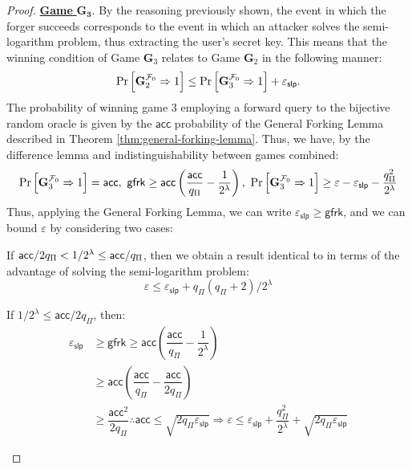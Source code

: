 \documentclass[version=submission, floatrow]{iacrcc}
\begin{document}
\begin{proof}
\noindent\underline{\textbf{Game} $\mathbf{G_{3}}$}. By the reasoning previously shown, the event in which the forger succeeds corresponds to the event in which an attacker solves the semi-logarithm problem, thus extracting the user's secret key. This means that the winning condition of Game $\mathbf{G}_{3}$ relates to Game $\mathbf{G}_{2}$ in the following manner:\[
    \mathrm{Pr}\left[\mathbf{G}_{2}^{\mathcal{F}_{0}} \Rightarrow 1\right] \le \mathrm{Pr}\left[\mathbf{G}_{3}^{\mathcal{F}_{0}} \Rightarrow 1\right]  + \varepsilon_{\mathsf{slp}}.
\]
The probability of winning game $3$ employing a forward query to the bijective random oracle is given by the $\mathsf{acc}$ probability of the General Forking Lemma described in Theorem \ref{thm:general-forking-lemma}. Thus, we have, by the difference lemma and indistinguishability between games combined:
\begin{equation*}
    \Probability{\mathbf{G}_{3}^{\Forger_{0}} \Rightarrow 1} = \mathsf{acc},\ \mathsf{gfrk} \ge \mathsf{acc}\left(\dfrac{\mathsf{acc}}{q_{\Pi}} - \dfrac{1}{2^{\lambda}}\right),\ \Probability{\mathbf{G}_{3}^{\Forger_{0}} \Rightarrow 1} \ge \varepsilon - \varepsilon_{\mathsf{slp}} - \dfrac{q_{\Pi}^{2}}{2^{\lambda}} 
\end{equation*}
Thus, applying the General Forking Lemma, we can write $\varepsilon_{\mathsf{slp}} \ge \mathsf{gfrk}$, and we can bound $\varepsilon$ by considering two cases:
\begin{case}
If $\mathsf{acc}/2q_{\Pi} < 1/2^{\lambda} \le \mathsf{acc}/q_{\Pi}$, then we obtain a result identical to \cite{CCS:FerKilPoe16} in terms of the advantage of solving the semi-logarithm problem:\[
    \varepsilon \le \varepsilon_{\mathsf{slp}} + q_{\Pi}\left(q_{\Pi}+2\right)/2^{\lambda}
\]
\end{case}
\begin{case}
If $1/2^{\lambda} \le \mathsf{acc}/2q_{\Pi}$, then:
\begin{align*}
    \varepsilon_{\mathsf{slp}} &\ge \mathsf{gfrk} \ge \mathsf{acc}\left(\dfrac{\mathsf{acc}}{q_{\Pi}} - \dfrac{1}{2^{\lambda}}\right) \\
    &\ge \mathsf{acc}\left(\dfrac{\mathsf{acc}}{q_{\Pi}} - \dfrac{\mathsf{acc}}{2q_{\Pi}}\right)\\
    &\ge\dfrac{\mathsf{acc}^{2}}{2q_{\Pi}} \therefore \mathsf{acc} \le \sqrt{2q_{\Pi}\varepsilon_{\mathsf{slp}}} \Rightarrow \varepsilon \le \varepsilon_{\mathsf{slp}} + \dfrac{q_{\Pi}^{2}}{2^{\lambda}} + \sqrt{2q_{\Pi}\varepsilon_{\mathsf{slp}}}
\end{align*}
\end{case}
\end{proof}
\end{document}
